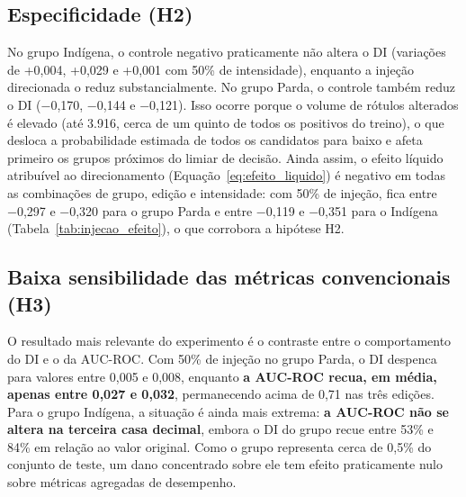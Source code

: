 \subsection{Especificidade (H2)}

No grupo Indígena, o controle negativo praticamente não altera o DI (variações de +0,004, +0,029 e +0,001 com 50\% de intensidade), enquanto a injeção direcionada o reduz substancialmente. No grupo Parda, o controle também reduz o DI (−0,170, −0,144 e −0,121). Isso ocorre porque o volume de rótulos alterados é elevado (até 3.916, cerca de um quinto de todos os positivos do treino), o que desloca a probabilidade estimada de todos os candidatos para baixo e afeta primeiro os grupos próximos do limiar de decisão. Ainda assim, o efeito líquido atribuível ao direcionamento (Equação~\eqref{eq:efeito_liquido}) é negativo em todas as combinações de grupo, edição e intensidade: com 50\% de injeção, fica entre −0,297 e −0,320 para o grupo Parda e entre −0,119 e −0,351 para o Indígena (Tabela~\ref{tab:injecao_efeito}), o que corrobora a hipótese H2.



\subsection{Baixa sensibilidade das métricas convencionais (H3)}

O resultado mais relevante do experimento é o contraste entre o comportamento do DI e o da AUC-ROC. Com 50\% de injeção no grupo Parda, o DI despenca para valores entre 0,005 e 0,008, enquanto \textbf{a AUC-ROC recua, em média, apenas entre 0,027 e 0,032}, permanecendo acima de 0,71 nas três edições. Para o grupo Indígena, a situação é ainda mais extrema: \textbf{a AUC-ROC não se altera na terceira casa decimal}, embora o DI do grupo recue entre 53\% e 84\% em relação ao valor original. Como o grupo representa cerca de 0,5\% do conjunto de teste, um dano concentrado sobre ele tem efeito praticamente nulo sobre métricas agregadas de desempenho.

